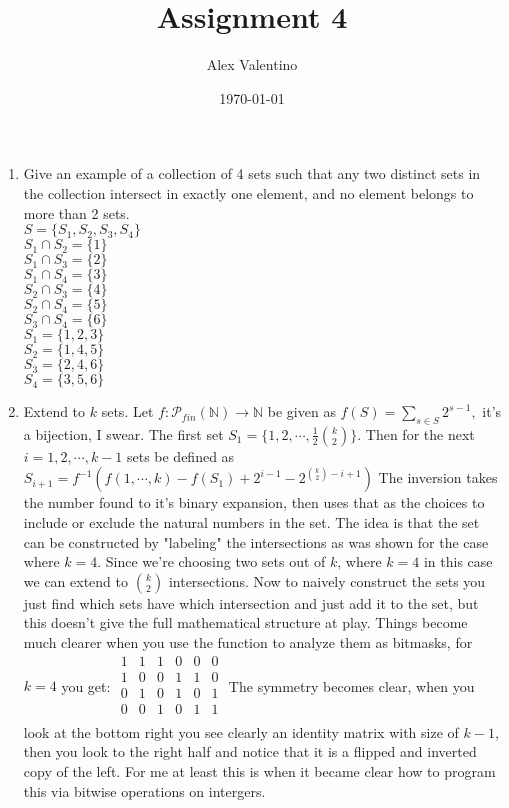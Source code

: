\documentclass[12pt, letterpaper]{article}
\date{\today}
\author{Alex Valentino}
\title{Assignment 4}
\newcommand{\N}{\mathbb{N}}
\newcommand{\Po}{\mathcal{P}}
\begin{document}
	\begin{enumerate}
		\item Give an example of a collection of 4 sets such that any two distinct sets in the collection
intersect in exactly one element, and no element belongs to more than 2 sets.\\
	$S = \{S_1, S_2, S_3, S_4\}$\\
	$S_1 \cap S_2 = \{1\}$\\
	$S_1 \cap S_3 = \{2\}$\\
	$S_1 \cap S_4 = \{3\}$\\
	$S_2 \cap S_3 = \{4\}$\\
	$S_2 \cap S_4 = \{5\}$\\
	$S_3 \cap S_4 = \{6\}$\\
	$S_1 = \{1,2,3\}$\\
	$S_2 = \{1,4,5\}$\\
	$S_3 = \{2,4,6\}$\\
	$S_4 = \{3,5,6\}$
	\item Extend to $k$ sets.  Let $f: \Po_{fin}(\N) \to \N$ be given as $f(S) = \displaystyle \sum_{s \in S} 2^{s-1},$ it's a bijection, I swear.
	The first set $S_1 = \{1,2,\cdots, \frac{1}{2} \binom{k}{2}\}$. Then for the next $i = 1,2,\cdots,k-1$ sets be defined as $S_{i+1} = f^{-1} (f(1,\cdots,k) - f(S_1) + 2^{i-1} - 2^{\binom{k}{2}-i+1})$  The inversion takes the number found to it's binary expansion, then uses that as the choices to include or exclude the natural numbers in the set.  The idea is that the set can be constructed by "labeling" the intersections as was shown for the case where $k=4$.  Since we're choosing two sets out of $k$, where $k=4$ in this case we can extend to $\binom{k}{2}$ intersections.  Now to naively construct the sets you just find which sets have which intersection and just add it to the set, but this doesn't give the full mathematical structure at play.  Things become much clearer when you use the function to analyze them as bitmasks, for $k=4$ you get:
	$\begin{matrix}
	1 & 1 & 1 & 0 & 0 & 0\\
	1 & 0 & 0 & 1 & 1 & 0\\
	0 & 1 & 0 & 1 & 0 & 1\\
	0 & 0 & 1 & 0 & 1 & 1\\
\end{matrix}	 $  The symmetry becomes clear, when you look at the bottom right you see clearly an identity matrix with size of $k-1$, then you look to the right half and notice that it is a flipped and inverted copy of the left.  For me at least this is when it became clear how to program this via bitwise operations on intergers.  
		
	\end{enumerate}
\end{document}
